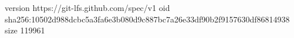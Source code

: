 version https://git-lfs.github.com/spec/v1
oid sha256:10502d988dcbc5a3fa6e3b080d9c887bc7a26e33df90b2f9157630df86814938
size 119961
